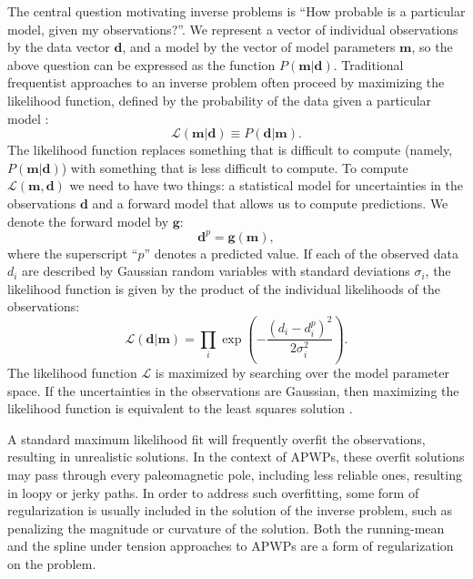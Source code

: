 \documentclass[11pt,letterpaper]{article}
\begin{document}
The central question motivating inverse problems is ``How probable is a particular model, given my observations?''. We represent a vector of individual observations by the data vector $\mathbf{d}$, and a model by the vector of model parameters $\mathbf{m}$, so the above question can be expressed as the function $P(\mathbf{m} \vert \mathbf{d})$. Traditional frequentist approaches to an inverse problem often proceed by maximizing the likelihood function, defined by the probability of the data given a particular model \citep[e.g][]{Aster2005a}:
\begin{equation}
\mathcal{L} ( \mathbf{m} \vert \mathbf{d} ) \equiv P( \mathbf{d} \vert \mathbf{m} ).
\label{eq:likelihood}
\end{equation}
The likelihood function replaces something that is difficult to compute (namely, $P(\mathbf{m} \vert \mathbf{d})$)
with something that is less difficult to compute. 
To compute $\mathcal{L}(\mathbf{m}, \mathbf{d})$ we need to have two things: a statistical model for 
uncertainties in the observations $\mathbf{d}$ and a forward model that allows us to compute
predictions. We denote the forward model by $\mathbf{g}$:
\begin{equation}
\mathbf{d}^p = \mathbf{g}(\mathbf{m}),
\label{eq:forward}
\end{equation}
where the superscript ``$p$'' denotes a predicted value.
If each of the observed data $d_i$ are described by Gaussian random variables with standard deviations $\sigma_i$, the likelihood function is given by the product of the individual likelihoods of the observations:
\begin{equation}
\mathcal{L}(\mathbf{d} | \mathbf{m} ) = \displaystyle\prod_i \exp\left({-\frac{(d_i - d_{i}^p)^2}{2 \sigma_i^2}}\right).
\label{eq:example_likelihood}
\end{equation}
The likelihood function $\mathcal{L}$ is maximized by searching over the model parameter space.
If the uncertainties in the observations are Gaussian, then maximizing the likelihood function is
equivalent to the least squares solution \citep{Aster2005a}.

A standard maximum likelihood fit will frequently overfit the observations, resulting in unrealistic solutions. In the context of APWPs, these overfit solutions may pass through every paleomagnetic pole, including less reliable ones, resulting in loopy or jerky paths. In order to address such overfitting, some form of regularization is usually included in the solution of the inverse problem, such as penalizing the magnitude or curvature of the solution. Both the running-mean and the spline under tension approaches to APWPs are a form of regularization on the problem.
\end{document}
